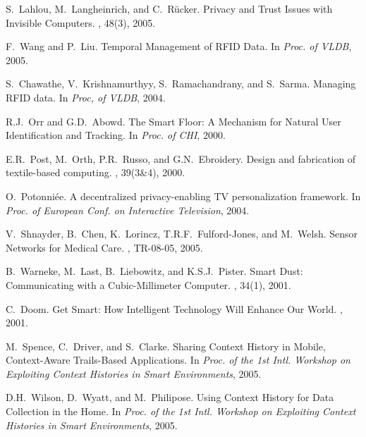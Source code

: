 \begin{thebibliography}{AH89}

S.~Lahlou, M.~Langheinrich, and C.~R\"{u}cker.
\newblock Privacy and Trust Issues with Invisible Computers.
, 48(3), 2005.

F.~Wang and P.~Liu.
\newblock Temporal Management of RFID Data.
\newblock In {\em Proc. of VLDB}, 2005.

S.~Chawathe, V.~Krishnamurthyy, S.~Ramachandrany, and S.~Sarma.
\newblock Managing RFID data.
\newblock In {\em Proc, of VLDB}, 2004.

R.J.~Orr and G.D.~Abowd.
\newblock The Smart Floor: A Mechanism for Natural User Identification and Tracking.
\newblock In {\em Proc. of CHI}, 2000.

E.R.~Post, M.~Orth, P.R.~Russo, and G.N.~Ebroidery.
\newblock Design and fabrication of textile-based computing.
, 39(3\&4), 2000.

O.~Potonni\'{e}e.
\newblock A decentralized privacy-enabling TV personalization framework.
\newblock In {\em Proc. of European Conf. on Interactive Television}, 2004.

V.~Shnayder, B.~Chen, K.~Lorincz, T.R.F.~Fulford-Jones, and M.~Welsh.
\newblock Sensor Networks for Medical Care.
, TR-08-05, 2005.

B.~Warneke, M.~Last, B.~Liebowitz, and K.S.J.~Pister.
\newblock Smart Dust: Communicating with a Cubic-Millimeter Computer.
, 34(1), 2001.

C.~Doom.
\newblock Get Smart: How Intelligent Technology Will Enhance Our World.
, 2001.

M.~Spence, C.~Driver, and S.~Clarke.
\newblock Sharing Context History in Mobile, Context-Aware Trails-Based Applications.
\newblock In {\em Proc. of the 1st Intl. Workshop on Exploiting Context Histories in Smart Environments}, 2005.

D.H.~Wilson, D.~Wyatt, and M.~Philipose.
\newblock Using Context History for Data Collection in the Home.
\newblock In {\em Proc. of the 1st Intl. Workshop on Exploiting Context Histories in Smart Environments}, 2005.


\end{thebibliography}
